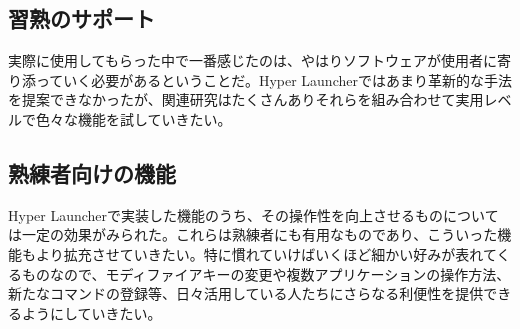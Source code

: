 \subsection{習熟のサポート}
実際に使用してもらった中で一番感じたのは、やはりソフトウェアが使用者に寄り添っていく必要があるということだ。Hyper Launcherではあまり革新的な手法を提案できなかったが、関連研究はたくさんありそれらを組み合わせて実用レベルで色々な機能を試していきたい。

\subsection{熟練者向けの機能}
Hyper Launcherで実装した機能のうち、その操作性を向上させるものについては一定の効果がみられた。これらは熟練者にも有用なものであり、こういった機能もより拡充させていきたい。特に慣れていけばいくほど細かい好みが表れてくるものなので、モディファイアキーの変更や複数アプリケーションの操作方法、新たなコマンドの登録等、日々活用している人たちにさらなる利便性を提供できるようにしていきたい。